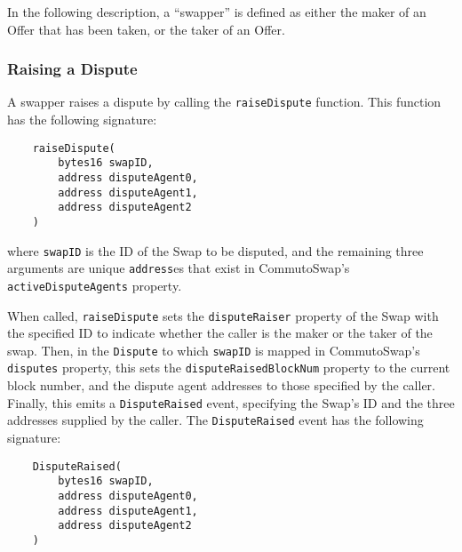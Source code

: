 \documentclass[11pt]{article}
\begin{document}
    In the following description, a ``swapper'' is defined as either the maker of an Offer that has
    been taken, or the taker of an Offer.

    \subsubsection*{Raising a Dispute}
    A swapper raises a dispute by calling the \verb|raiseDispute| function.
    This function has the following signature:
    \begin{verbatim}
    raiseDispute(
        bytes16 swapID,
        address disputeAgent0,
        address disputeAgent1,
        address disputeAgent2
    )
    \end{verbatim}
    where \verb|swapID| is the ID of the Swap to be disputed, and the remaining three arguments are
    unique \verb|address|es that exist in CommutoSwap's \verb|activeDisputeAgents| property.

    When called, \verb|raiseDispute| sets the \verb|disputeRaiser| property of the Swap with the
    specified ID to indicate whether the caller is the maker or the taker of the swap.
    Then, in the \verb|Dispute| to which \verb|swapID| is mapped in CommutoSwap's \verb|disputes|
    property, this sets the \verb|disputeRaisedBlockNum| property to the current block number, and
    the dispute agent addresses to those specified by the caller.
    Finally, this emits a \verb|DisputeRaised| event, specifying the Swap's ID and the three
    addresses supplied by the caller.
    The \verb|DisputeRaised| event has the following signature:
    \begin{verbatim}
    DisputeRaised(
        bytes16 swapID,
        address disputeAgent0,
        address disputeAgent1,
        address disputeAgent2
    )
    \end{verbatim}
\end{document}
